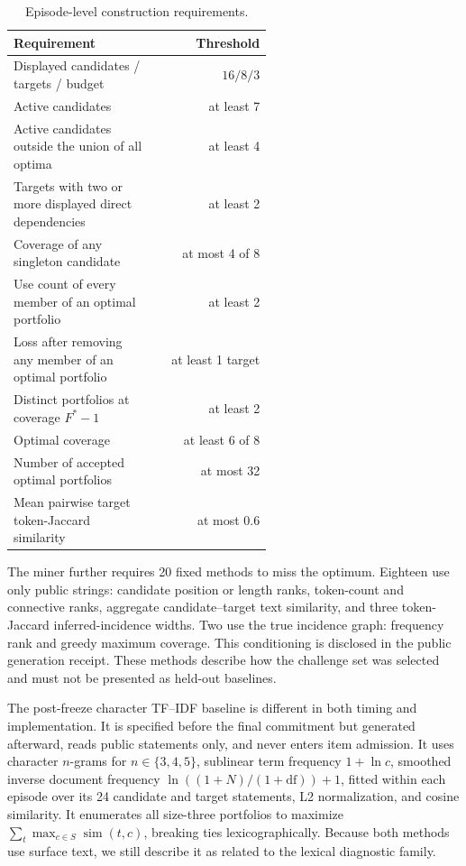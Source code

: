 \begin{table}[ht]
\centering
\caption{Episode-level construction requirements.}
\label{tab:filters}
\small
\begin{tabular}{p{0.57\linewidth}r}
\toprule
Requirement & Threshold \\
\midrule
Displayed candidates / targets / budget & $16/8/3$ \\
Active candidates & at least 7 \\
Active candidates outside the union of all optima & at least 4 \\
Targets with two or more displayed direct dependencies & at least 2 \\
Coverage of any singleton candidate & at most 4 of 8 \\
Use count of every member of an optimal portfolio & at least 2 \\
Loss after removing any member of an optimal portfolio & at least 1 target \\
Distinct portfolios at coverage $F^*-1$ & at least 2 \\
Optimal coverage & at least 6 of 8 \\
Number of accepted optimal portfolios & at most 32 \\
Mean pairwise target token-Jaccard similarity & at most 0.6 \\
\bottomrule
\end{tabular}
\end{table}

The miner further requires 20 fixed methods to miss the optimum.  Eighteen use
only public strings: candidate position or length ranks, token-count and
connective ranks, aggregate candidate--target text similarity, and three
token-Jaccard inferred-incidence widths.  Two use the true incidence graph:
frequency rank and greedy maximum coverage.  This conditioning is disclosed in
the public generation receipt.  These methods describe how the challenge set
was selected and must not be presented as held-out baselines.

The post-freeze character TF--IDF baseline is different in both timing and
implementation.  It is specified before the final commitment but generated
afterward, reads public statements only, and never enters item admission.  It
uses character $n$-grams for $n\in\{3,4,5\}$, sublinear term frequency
$1+\ln c$, smoothed inverse document frequency
$\ln((1+N)/(1+\mathrm{df}))+1$, fitted within each episode over its 24
candidate and target statements, L2 normalization, and cosine similarity.  It
enumerates all size-three portfolios to maximize
$\sum_t\max_{c\in S}\operatorname{sim}(t,c)$, breaking ties
lexicographically.  Because both methods use surface text, we still describe
it as related to the lexical diagnostic family.

